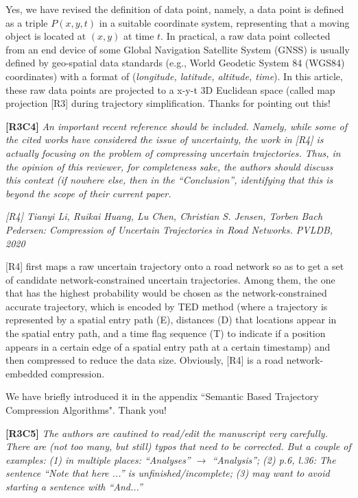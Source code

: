 \documentclass{letter}
\begin{document}
Yes, we have revised the definition of data point, namely, a data point is defined as a triple $P(x, y, t)$ in a suitable coordinate system, representing that a moving object is located at {$(x, y)$} at time $t$. In practical, a raw data point collected from an end device of some Global Navigation Satellite System (GNSS) is usually defined by geo-spatial data standards (e.g., World Geodetic System 84 (WGS84) coordinates) with a format of ({\em longitude, latitude, altitude, time}). In this article, these raw data points are projected to a x-y-t 3D Euclidean space (called map projection [R3] during trajectory simplification.
Thanks for pointing out this!



\textbf{[R3C4]} \emph{An important recent reference should be included. Namely, while some of the cited works have considered the issue of uncertainty, the work in [R4] is actually focusing on the problem of compressing uncertain trajectories. Thus, in the opinion of this reviewer, for completeness sake, the authors should discuss this context (if nowhere else, then in the ``Conclusion'', identifying that this is beyond the scope of their current paper. }

\emph{[R4] Tianyi Li, Ruikai Huang, Lu Chen, Christian S. Jensen, Torben Bach Pedersen:
	Compression of Uncertain Trajectories in Road Networks. PVLDB, 2020}

[R4] first maps a raw uncertain trajectory onto a road network so as to get a set of candidate network-constrained uncertain trajectories. Among them, the one that has the highest probability would be chosen
as the network-constrained accurate trajectory, which is encoded by TED method (where a trajectory is represented by a spatial entry path (E),
distances (D) that locations appear in the spatial entry path, and a
time flag sequence (T) to indicate if a position appears in a certain
edge of a spatial entry path at a certain timestamp) and then compressed to reduce the data size. Obviously, [R4] is a road network-embedded compression. 


We have briefly introduced it in the appendix ``Semantic Based Trajectory Compression Algorithms". Thank you!


\textbf{[R3C5]} \emph{The authors are cautined to read/edit the manuscript very carefully. There are (not too many, but still) typos that need to be corrected. But a couple of examples:}
  \emph{(1) in multiple places: ``Analyses'' $\rightarrow$ ``Analysis'';}
  \emph{(2) p.6, l.36: The sentence ``Note that here ...'' is unfinished/incomplete;}
  \emph{(3) may want to avoid starting a sentence with ``And...''}
\end{document}
